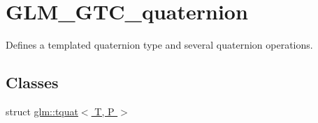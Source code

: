 \hypertarget{group__gtc__quaternion}{\section{G\-L\-M\-\_\-\-G\-T\-C\-\_\-quaternion}
\label{group__gtc__quaternion}
}


Defines a templated quaternion type and several quaternion operations.  


\subsection*{Classes}
\begin{DoxyCompactItemize}
\item 
struct \hyperlink{structglm_1_1tquat}{glm\-::tquat$<$ T, P $>$}
\end{DoxyCompactItemize}
